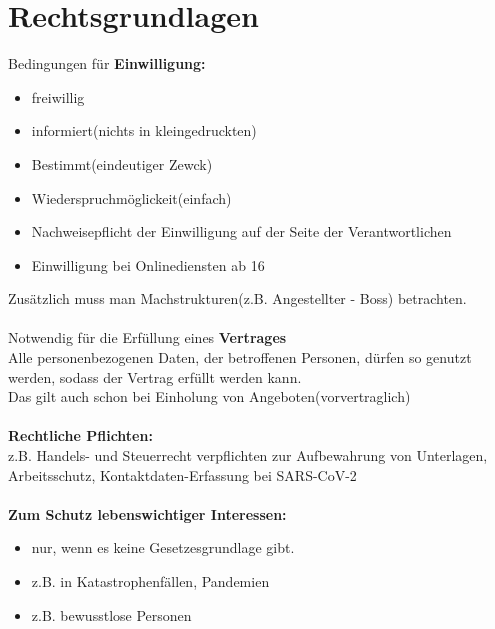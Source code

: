 \documentclass[12pt,a4paper]{article}
\begin{document}
    \section{Rechtsgrundlagen}
    Bedingungen für \textbf{Einwilligung:}\\
    \begin{itemize}
        \item freiwillig
        \item informiert(nichts in kleingedruckten)
        \item Bestimmt(eindeutiger Zewck)
        \item Wiederspruchmöglickeit(einfach)
        \item Nachweisepflicht der Einwilligung auf der Seite der Verantwortlichen
        \item Einwilligung bei Onlinediensten ab 16
    \end{itemize}
    Zusätzlich muss man Machstrukturen(z.B. Angestellter - Boss) betrachten. \\ \\
    Notwendig für die Erfüllung eines \textbf{Vertrages}\\
    Alle personenbezogenen Daten, der betroffenen Personen, dürfen so genutzt werden, sodass der Vertrag erfüllt werden kann. \\
    Das gilt auch schon bei Einholung von Angeboten(vorvertraglich) \\ \\
    \textbf{Rechtliche Pflichten:}\\
        z.B. Handels- und Steuerrecht verpflichten zur Aufbewahrung von Unterlagen, Arbeitsschutz, Kontaktdaten-Erfassung bei SARS-CoV-2
        \\ \\
    \textbf{Zum Schutz lebenswichtiger Interessen:}\\
        \begin{itemize}
            \item nur, wenn es keine Gesetzesgrundlage gibt.
            \item z.B. in Katastrophenfällen, Pandemien
            \item z.B. bewusstlose Personen
        \end{itemize}
\end{document}
